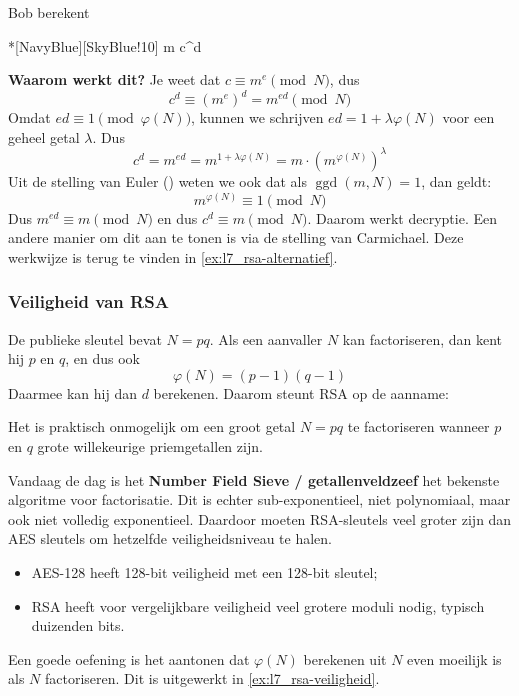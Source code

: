 
Bob berekent
\begin{equationbox}*[NavyBlue][SkyBlue!10]
    m \equiv c^d 
\end{equationbox}

\textbf{Waarom werkt dit?}  \newline
Je weet dat $c \equiv m^e \pmod N$, dus
\begin{equation*}
    c^d \equiv \left(m^e\right)^d = m^{ed} \pmod N
\end{equation*}
Omdat $ed \equiv 1 \pmod {\varphi(N)}$, kunnen we schrijven $ed = 1 + \lambda \varphi(N)$ voor een geheel getal $\lambda$. Dus
\begin{equation*}
    c^d = m^{ed} = m^{1 + \lambda\varphi(N)} = m\cdot\left( m^{\varphi(N)} \right)^\lambda
\end{equation*}
Uit de stelling van Euler () weten we ook dat als $\operatorname{ggd}(m,N) = 1$, dan geldt:
\begin{equation*}
    m^{\varphi(N)} \equiv 1 \pmod N
\end{equation*}
Dus $m^{ed} \equiv m \pmod N$ en dus $c^d \equiv m \pmod N$. Daarom werkt decryptie. Een andere manier om dit aan te tonen is via de stelling van Carmichael. Deze werkwijze is terug te vinden in \cref{ex:l7_rsa-alternatief}.


\subsubsection{Veiligheid van RSA}

De publieke sleutel bevat $N=pq$. Als een aanvaller $N$ kan factoriseren, dan kent hij $p$ en $q$, en dus ook
\begin{equation*}
    \varphi(N) = (p-1)(q-1)
\end{equation*}
Daarmee kan hij dan $d$ berekenen. Daarom steunt RSA op de aanname:
\begin{barbox}[RoyalPurple!75][gray!3]
    Het is praktisch onmogelijk om een groot getal $N = pq$ te factoriseren wanneer $p$ en $q$ grote willekeurige priemgetallen zijn.
\end{barbox}
Vandaag de dag is het \textbf{Number Field Sieve / getallenveldzeef} het bekenste algoritme voor factorisatie. Dit is echter sub-exponentieel, niet polynomiaal, maar ook niet volledig exponentieel. Daardoor moeten RSA-sleutels veel groter zijn dan AES sleutels om hetzelfde veiligheidsniveau te halen.
\begin{itemize}
    \item AES-128 heeft 128-bit veiligheid met een 128-bit sleutel;
    \item RSA heeft voor vergelijkbare veiligheid veel grotere moduli nodig, typisch duizenden bits.
\end{itemize}
Een goede oefening is het aantonen dat $\varphi(N)$ berekenen uit $N$ even moeilijk is als $N$ factoriseren. Dit is uitgewerkt in \cref{ex:l7_rsa-veiligheid}.

